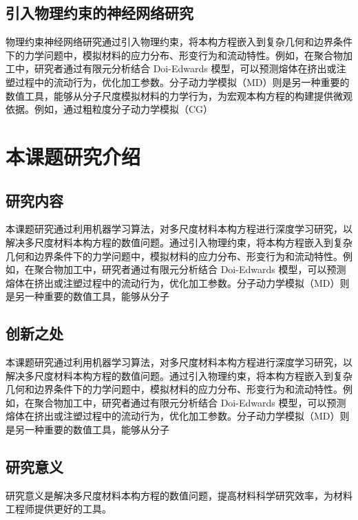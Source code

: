 \subsection{引入物理约束的神经网络研究}
物理约束神经网络研究通过引入物理约束，将本构方程嵌入到复杂几何和边界条件下的力学问题中，模拟材料的应力分布、形变行为和流动特性。例如，在聚合物加工中，研究者通过有限元分析结合 Doi-Edwards 模型，可以预测熔体在挤出或注塑过程中的流动行为，优化加工参数。分子动力学模拟（MD）则是另一种重要的数值工具，能够从分子尺度模拟材料的力学行为，为宏观本构方程的构建提供微观依据。例如，通过粗粒度分子动力学模拟（CG）
\section{本课题研究介绍}
\subsection{研究内容}
本课题研究通过利用机器学习算法，对多尺度材料本构方程进行深度学习研究，以解决多尺度材料本构方程的数值问题。通过引入物理约束，将本构方程嵌入到复杂几何和边界条件下的力学问题中，模拟材料的应力分布、形变行为和流动特性。例如，在聚合物加工中，研究者通过有限元分析结合 Doi-Edwards 模型，可以预测熔体在挤出或注塑过程中的流动行为，优化加工参数。分子动力学模拟（MD）则是另一种重要的数值工具，能够从分子
\subsection{创新之处}
本课题研究通过利用机器学习算法，对多尺度材料本构方程进行深度学习研究，以解决多尺度材料本构方程的数值问题。通过引入物理约束，将本构方程嵌入到复杂几何和边界条件下的力学问题中，模拟材料的应力分布、形变行为和流动特性。例如，在聚合物加工中，研究者通过有限元分析结合 Doi-Edwards 模型，可以预测熔体在挤出或注塑过程中的流动行为，优化加工参数。分子动力学模拟（MD）则是另一种重要的数值工具，能够从分子
\subsection{研究意义}
研究意义是解决多尺度材料本构方程的数值问题，提高材料科学研究效率，为材料工程师提供更好的工具。


